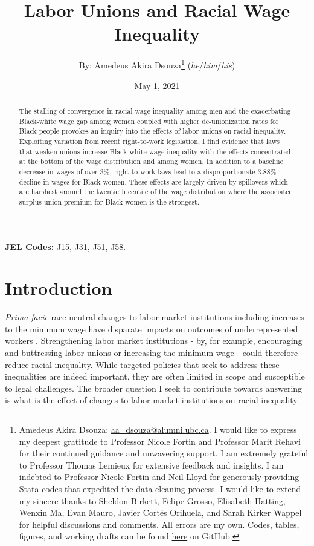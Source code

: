 \documentclass[11pt]{article}
\title{Labor Unions and Racial Wage Inequality}
\author{By: Amedeus Akira Dsouza\thanks{Amedeus Akira Dsouza: \href{mailto:aa_dsouza@alumni.ubc.ca}{aa\_dsouza@alumni.ubc.ca}. I would like to express my deepest gratitude to Professor Nicole Fortin and Professor Marit Rehavi for their continued guidance and unwavering support. I am extremely grateful to Professor Thomas Lemieux for extensive feedback and insights. I am indebted to Professor Nicole Fortin and Neil Lloyd for generously providing Stata codes that expedited the data cleaning process. I would like to extend my sincere thanks to Sheldon Birkett, Felipe Grosso, Elisabeth Hatting, Wenxin Ma, Evan Mauro, Javier Cort\'{e}s Orihuela, and Sarah Kirker Wappel for helpful discussions and comments. All errors are my own. Codes, tables, figures, and working drafts can be found \href{https://github.com/aadsouza/econ499}{here} on GitHub.} \textsc{ (}\textit{he}\textsc{/}\textit{him}\textsc{/}\textit{his}\textsc{)}}
\affil{University of British Columbia}
\affil{Supervised by: Nicole M. Fortin and M. Marit Rehavi}
\date{May 1, 2021}
\begin{document}
\begin{titlepage}
\maketitle
\thispagestyle{empty}
\begin{abstract}
The stalling of convergence in racial wage inequality among men and the exacerbating Black-white wage gap among women coupled with higher de-unionization rates for Black people provokes an inquiry into the effects of labor unions on racial inequality. Exploiting variation from recent right-to-work legislation, I find evidence that laws that weaken unions increase Black-white wage inequality with the effects concentrated at the bottom of the wage distribution and among women. In addition to a baseline decrease in wages of over 3\%, right-to-work laws lead to a disproportionate 3.88\% decline in wages for Black women. These effects are largely driven by spillovers which are harshest around the twentieth centile of the wage distribution where the associated surplus union premium for Black women is the strongest.
\end{abstract}

\textbf{JEL Codes:} J15, J31, J51, J58.

\end{titlepage}
\doublespacing

\section{Introduction}\label{sec:intro}
\textit{Prima facie} race-neutral changes to labor market institutions including increases to the minimum wage have disparate impacts on outcomes of underrepresented workers \citep[see, for example,][]{derenoncourtmontialoux2020}. Strengthening labor market institutions - by, for example, encouraging and buttressing labor unions or increasing the minimum wage - could therefore reduce racial inequality. While targeted policies that seek to address these inequalities are indeed important, they are often limited in scope and susceptible to legal challenges. The broader question I seek to contribute towards answering is what is the effect of changes to labor market institutions on racial inequality. 
\end{document}
